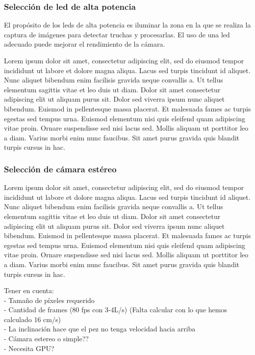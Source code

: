 \subsubsection{Selección de led de alta potencia} %

El propósito de los leds de alta potencia es iluminar la zona en la que se realiza la captura de imágenes para detectar truchas y procesarlas. El uso de una led adecuado puede mejorar el rendimiento de la cámara.

Lorem ipsum dolor sit amet, consectetur adipiscing elit, sed do eiusmod tempor incididunt ut labore et dolore magna aliqua. Lacus sed turpis tincidunt id aliquet. Nunc aliquet bibendum enim facilisis gravida neque convallis a. Ut tellus elementum sagittis vitae et leo duis ut diam. Dolor sit amet consectetur adipiscing elit ut aliquam purus sit. Dolor sed viverra ipsum nunc aliquet bibendum. Euismod in pellentesque massa placerat. Et malesuada fames ac turpis egestas sed tempus urna. Euismod elementum nisi quis eleifend quam adipiscing vitae proin. Ornare suspendisse sed nisi lacus sed. Mollis aliquam ut porttitor leo a diam. Varius morbi enim nunc faucibus. Sit amet purus gravida quis blandit turpis cursus in hac.


\subsubsection{Selección de cámara estéreo} %

Lorem ipsum dolor sit amet, consectetur adipiscing elit, sed do eiusmod tempor incididunt ut labore et dolore magna aliqua. Lacus sed turpis tincidunt id aliquet. Nunc aliquet bibendum enim facilisis gravida neque convallis a. Ut tellus elementum sagittis vitae et leo duis ut diam. Dolor sit amet consectetur adipiscing elit ut aliquam purus sit. Dolor sed viverra ipsum nunc aliquet bibendum. Euismod in pellentesque massa placerat. Et malesuada fames ac turpis egestas sed tempus urna. Euismod elementum nisi quis eleifend quam adipiscing vitae proin. Ornare suspendisse sed nisi lacus sed. Mollis aliquam ut porttitor leo a diam. Varius morbi enim nunc faucibus. Sit amet purus gravida quis blandit turpis cursus in hac.

Tener en cuenta: \\
- Tamaño de píxeles requerido \\
- Cantidad de frames (80 fps con 3-4L/s) (Falta calcular con lo que hemos calculado 16 cm/s) \\ 
- La inclinación hace que el pez no tenga velocidad hacia arriba \\
- Cámara estereo o simple?? \\
- Necesita GPU? \\

